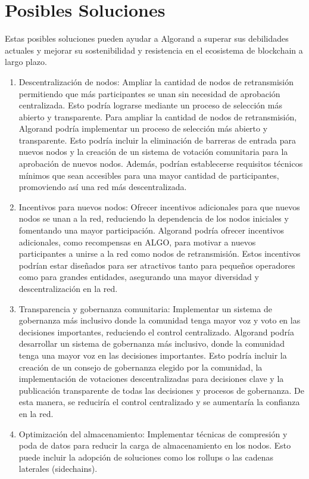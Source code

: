 \documentclass{article}
\begin{document}
\section{Posibles Soluciones}

Estas posibles soluciones pueden ayudar a Algorand a superar sus debilidades actuales y mejorar su sostenibilidad y resistencia en el ecosistema de blockchain a largo plazo.

\begin{enumerate}
    \item Descentralización de nodos: Ampliar la cantidad de nodos de retransmisión permitiendo que más participantes se unan sin necesidad de aprobación centralizada. Esto podría lograrse mediante un proceso de selección más abierto y transparente.
    Para ampliar la cantidad de nodos de retransmisión, Algorand podría implementar un proceso de selección más abierto y transparente. Esto podría incluir la eliminación de barreras de entrada para nuevos nodos y la creación de un sistema de votación comunitaria para la aprobación de nuevos nodos. Además, podrían establecerse requisitos técnicos mínimos que sean accesibles para una mayor cantidad de participantes, promoviendo así una red más descentralizada.
    \item Incentivos para nuevos nodos: Ofrecer incentivos adicionales para que nuevos nodos se unan a la red, reduciendo la dependencia de los nodos iniciales y fomentando una mayor participación.
    Algorand podría ofrecer incentivos adicionales, como recompensas en ALGO, para motivar a nuevos participantes a unirse a la red como nodos de retransmisión. Estos incentivos podrían estar diseñados para ser atractivos tanto para pequeños operadores como para grandes entidades, asegurando una mayor diversidad y descentralización en la red.
    \item Transparencia y gobernanza comunitaria: Implementar un sistema de gobernanza más inclusivo donde la comunidad tenga mayor voz y voto en las decisiones importantes, reduciendo el control centralizado.
    Algorand podría desarrollar un sistema de gobernanza más inclusivo, donde la comunidad tenga una mayor voz en las decisiones importantes. Esto podría incluir la creación de un consejo de gobernanza elegido por la comunidad, la implementación de votaciones descentralizadas para decisiones clave y la publicación transparente de todas las decisiones y procesos de gobernanza. De esta manera, se reduciría el control centralizado y se aumentaría la confianza en la red.
    \item Optimización del almacenamiento: Implementar técnicas de compresión y poda de datos para reducir la carga de almacenamiento en los nodos. Esto puede incluir la adopción de soluciones como los rollups o las cadenas laterales (sidechains).

\end{enumerate}
\end{document}
